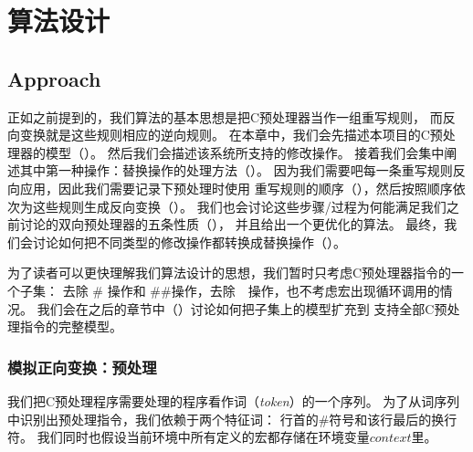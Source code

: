 \chapter{算法设计}
\section{Approach}
\label{sec:approach}
正如之前提到的，我们算法的基本思想是把C预处理器当作一组重写规则，
而反向变换就是这些规则相应的逆向规则。
在本章中，我们会先描述本项目的C预处理器的模型（）。
然后我们会描述该系统所支持的修改操作。
接着我们会集中阐述其中第一种操作：替换操作的处理方法（）。
因为我们需要吧每一条重写规则反向应用，因此我们需要记录下预处理时使用
重写规则的顺序（），然后按照顺序依次为这些规则生成反向变换（）。
我们也会讨论这些步骤/过程为何能满足我们之前讨论的双向预处理器的五条性质（），
并且给出一个更优化的算法。
最终，我们会讨论如何把不同类型的修改操作都转换成替换操作（）。



为了读者可以更快理解我们算法设计的思想，我们暂时只考虑C预处理器指令的一个子集：
去除 \# 操作和 \#\#操作，去除~~操作，也不考虑宏出现循环调用的情况。
我们会在之后的章节中（）讨论如何把子集上的模型扩充到
支持全部C预处理指令的完整模型。

\newcommand{\dstart}{\ensuremath{\langle\#}\xspace}
\newcommand{\dend}{\ensuremath{\rangle}\xspace}

\subsection{模拟正向变换：预处理}\label{sec:forward}
我们把C预处理程序需要处理的程序看作词（\emph{token}）的一个序列。
为了从词序列中识别出预处理指令，我们依赖于两个特征词：
行首的\#符号和该行最后的换行符。
我们同时也假设当前环境中所有定义的宏都存储在环境变量\emph{$context$}里。

